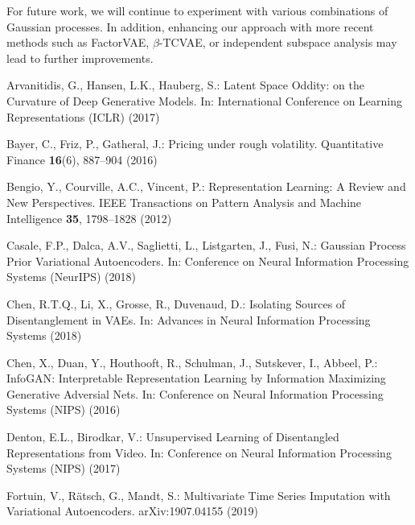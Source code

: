 \documentclass[runningheads]{llncs}
\begin{document}
   For future work, we will continue to experiment with various combinations of Gaussian processes. In addition, enhancing our approach with more recent methods such as FactorVAE, $\beta$-TCVAE, or independent subspace analysis  \cite{Stuehmer2020} may lead to further improvements. 

  	
\begin{thebibliography}{10}
	\providecommand{\url}[1]{\texttt{#1}}
	\providecommand{\urlprefix}{URL }
	\providecommand{\doi}[1]{https://doi.org/#1}
	
	Arvanitidis, G., Hansen, L.K., Hauberg, S.: Latent {S}pace {O}ddity: on the
	{C}urvature of {D}eep {G}enerative {M}odels. In: International Conference on
	Learning Representations (ICLR) (2017)
	
	Bayer, C., Friz, P., Gatheral, J.: Pricing under rough volatility. Quantitative
	Finance  \textbf{16}(6),  887--904 (2016)
	
	Bengio, Y., Courville, A.C., Vincent, P.: Representation {L}earning: {A}
	{R}eview and {N}ew {P}erspectives. IEEE Transactions on Pattern Analysis and
	Machine Intelligence  \textbf{35},  1798--1828 (2012)
	
	Casale, F.P., Dalca, A.V., Saglietti, L., Listgarten, J., Fusi, N.: Gaussian
	{P}rocess {P}rior {V}ariational {A}utoencoders. In: Conference on Neural
	Information Processing Systems (NeurIPS) (2018)
	
	Chen, R.T.Q., Li, X., Grosse, R., Duvenaud, D.: Isolating {S}ources of
	{D}isentanglement in {VAE}s. In: Advances in Neural Information Processing
	Systems (2018)
	
	Chen, X., Duan, Y., Houthooft, R., Schulman, J., Sutskever, I., Abbeel, P.:
	Info{GAN}: {I}nterpretable {R}epresentation {L}earning by {I}nformation
	{M}aximizing {G}enerative {A}dversial {N}ets. In: Conference on Neural
	Information Processing Systems (NIPS) (2016)
	
	Denton, E.L., Birodkar, V.: Unsupervised {L}earning of {D}isentangled
	{R}epresentations from {V}ideo. In: Conference on Neural Information
	Processing Systems (NIPS) (2017)
	
	Fortuin, V., R{\"a}tsch, G., Mandt, S.: Multivariate {T}ime {S}eries
	{I}mputation with {V}ariational {A}utoencoders. arXiv:1907.04155  (2019)
	

\end{thebibliography}
\end{document}

